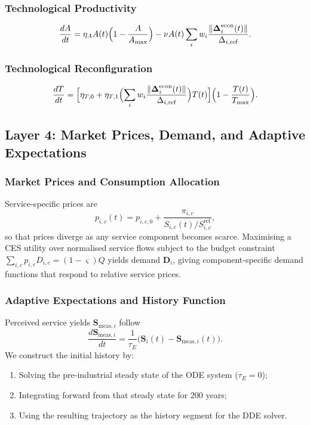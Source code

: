 \documentclass[twocolumn,10pt]{article}
\begin{document}
\subsubsection{Technological Productivity}
\begin{equation}
\frac{dA}{dt} = \eta_A A(t) \Bigl( 1 - \frac{A}{A_{\max}} \Bigr) - \nu A(t) \sum_i w_i
                \frac{\|\boldsymbol{\Delta}_i^{\text{econ}}(t)\|}{\Delta_{i,\text{ref}}}.
\label{eq:a-corrected}
\end{equation}

\subsubsection{Technological Reconfiguration}
\begin{equation}
\frac{dT}{dt} = \Bigl[ \eta_{T,0} + \eta_{T,1} \Bigl( \sum_i w_i
                \frac{\|\boldsymbol{\Delta}_i^{\text{econ}}(t)\|}{\Delta_{i,\text{ref}}} \Bigr) T(t) \Bigr]
                \Bigl( 1 - \frac{T(t)}{T_{\max}} \Bigr).
\label{eq:t-corrected}
\end{equation}

\subsection{Layer 4: Market Prices, Demand, and Adaptive Expectations}
\label{sec:layer4}
\subsubsection{Market Prices and Consumption Allocation}
Service-specific prices are
\[
p_{i,c}(t) = p_{i,c,0} + \frac{\pi_{i,c}}{S_{i,c}(t)/S_{i,c}^{\text{ref}}},
\]
so that prices diverge as any service component becomes scarce. Maximising a CES utility \cite{arrow1961} over normalised service flows subject to the budget constraint \(\sum_{i,c} p_{i,c} D_{i,c} = (1-\varsigma)Q\) yields demand \(\mathbf{D}_i\), giving component-specific demand functions that respond to relative service prices.

\subsubsection{Adaptive Expectations and History Function}
Perceived service yields \(\mathbf{S}_{\text{meas},i}\) follow
\[
\frac{d\mathbf{S}_{\text{meas},i}}{dt} = \frac{1}{\tau_E} \bigl( \mathbf{S}_i(t) - \mathbf{S}_{\text{meas},i}(t) \bigr).
\]
We construct the initial history by:
\begin{enumerate}
\item Solving the pre-industrial steady state of the ODE system (\(\tau_E = 0\));
\item Integrating forward from that steady state for 200 years;
\item Using the resulting trajectory as the history segment for the DDE solver.
\end{enumerate}
\end{document}
